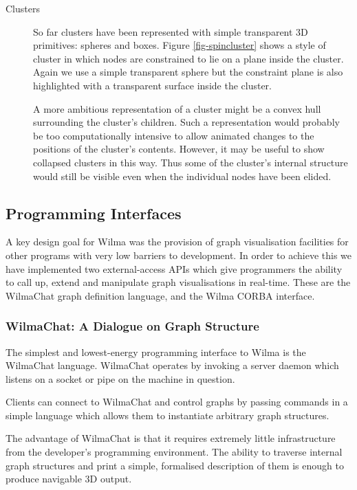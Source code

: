 \documentclass[runningheads]{cl2emult}
\begin{document}
\begin{description}
\item[Clusters] So far clusters have been represented with simple
transparent 3D
primitives: spheres and boxes.  Figure \ref{fig-spincluster} shows a
style of cluster in which nodes are constrained to lie on a plane
inside the cluster.  Again we use a simple transparent sphere but the
constraint plane is also highlighted with a transparent surface inside
the cluster.

A more ambitious representation of a cluster might be a convex hull
surrounding the cluster's children.  Such a representation
would probably be too computationally intensive to allow animated
changes to the positions of the cluster's contents.  However, it may
be useful to show collapsed clusters in this way.  Thus some of the
cluster's internal structure would still be visible even when the
individual nodes have been elided.

\end{description}


\subsection{Programming Interfaces}
\label{API}

A key design goal for Wilma was the provision of graph visualisation
facilities for other programs with very low barriers to development.  In order
to achieve this we have implemented two external-access APIs which give
programmers the ability to call up, extend and manipulate graph visualisations
in real-time.  These are the WilmaChat graph definition language, and the
Wilma CORBA interface.

\subsubsection{WilmaChat: A Dialogue on Graph Structure}

The simplest and lowest-energy programming interface to Wilma is the WilmaChat
language.  WilmaChat operates by invoking a server daemon which listens on a
socket or pipe on the machine in question.

Clients can connect to WilmaChat and control graphs by passing commands
in a simple language which allows them to instantiate arbitrary graph
structures.

The advantage of WilmaChat is that it requires extremely little infrastructure
from the developer's programming environment.  The ability to traverse
internal graph structures and print a simple, formalised description of them
is enough to produce navigable 3D output.
\end{document}

